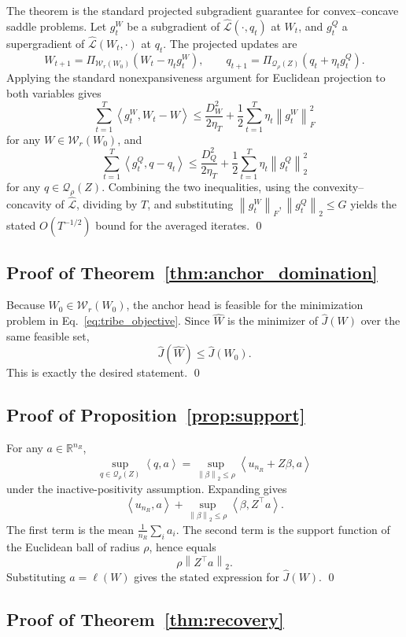 \documentclass{article}
\newcommand{\RR}{\mathbb{R}}
\newcommand{\cQ}{\mathcal{Q}}
\newcommand{\cW}{\mathcal{W}}
\newcommand{\1}{\mathbbm{1}}
\newcommand{\norm}[1]{\left\lVert #1 \right\rVert}
\newcommand{\loss}{\ell}
\newcommand{\inner}[2]{\left\langle #1, #2 \right\rangle}
\begin{document}
The theorem is the standard projected subgradient guarantee for convex--concave saddle problems. Let \(g_t^W\) be a subgradient of \(\widehat{\mathcal L}(\cdot,q_t)\) at \(W_t\), and \(g_t^Q\) a supergradient of \(\widehat{\mathcal L}(W_t,\cdot)\) at \(q_t\). The projected updates are
\[
    W_{t+1} = \Pi_{\cW_r(W_0)}(W_t - \eta_t g_t^W),
    \qquad
    q_{t+1} = \Pi_{\cQ_\rho(Z)}(q_t + \eta_t g_t^Q).
\]
Applying the standard nonexpansiveness argument for Euclidean projection to both variables gives
\[
    \sum_{t=1}^T \inner{g_t^W}{W_t - W}
    \le
    \frac{D_W^2}{2\eta_T}
    +
    \frac{1}{2}\sum_{t=1}^T \eta_t \norm{g_t^W}_F^2
\]
for any \(W\in\cW_r(W_0)\), and
\[
    \sum_{t=1}^T \inner{g_t^Q}{q - q_t}
    \le
    \frac{D_Q^2}{2\eta_T}
    +
    \frac{1}{2}\sum_{t=1}^T \eta_t \norm{g_t^Q}_2^2
\]
for any \(q\in\cQ_\rho(Z)\). Combining the two inequalities, using the convexity--concavity of \(\widehat{\mathcal L}\), dividing by \(T\), and substituting \(\norm{g_t^W}_F,\norm{g_t^Q}_2 \le G\) yields the stated \(O(T^{-1/2})\) bound for the averaged iterates.
\qed

\subsection{Proof of Theorem~\ref{thm:anchor_domination}}

Because \(W_0 \in \cW_r(W_0)\), the anchor head is feasible for the minimization problem in Eq.~\eqref{eq:tribe_objective}. Since \(\widehat W\) is the minimizer of \(\widehat J(W)\) over the same feasible set,
\[
    \widehat J(\widehat W) \le \widehat J(W_0).
\]
This is exactly the desired statement.
\qed

\subsection{Proof of Proposition~\ref{prop:support}}

For any \(a\in\RR^{n_R}\),
\[
    \sup_{q\in\cQ_\rho(Z)} \inner{q}{a}
    =
    \sup_{\norm{\beta}_2\le \rho}
    \inner{u_{n_R} + Z\beta}{a}
\]
under the inactive-positivity assumption. Expanding gives
\[
    \inner{u_{n_R}}{a}
    +
    \sup_{\norm{\beta}_2\le \rho}
    \inner{\beta}{Z^\top a}.
\]
The first term is the mean \(\frac{1}{n_R}\sum_i a_i\). The second term is the support function of the Euclidean ball of radius \(\rho\), hence equals
\[
    \rho \norm{Z^\top a}_2.
\]
Substituting \(a=\loss(W)\) gives the stated expression for \(\widehat J(W)\).
\qed

\subsection{Proof of Theorem~\ref{thm:recovery}}
\end{document}
